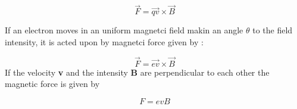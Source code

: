 \documentclass[a4paper,20pt,twoside]{report}
\begin{document}
	\begin{equation}
	\vec{F} = \vec{qv} \times \vec{B}
	\end{equation}
	
	If an electron moves in an uniform magnetci field makin an angle $\theta$ to the field intensity, it is acted upon by magnetci force given by : 
	
	\begin{equation}
	\vec{F} = \vec{ev} \times \vec{B}
	\end{equation}
	If the velocity \textbf{v} and the intensity \textbf{B} are perpendicular to each other the magnetic
	force is given by 
	
	\begin{equation}
	F = ev B
	\end{equation}
	
	
  	
\end{document}
